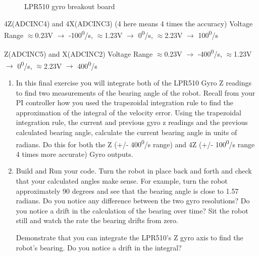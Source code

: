 \documentclass[11pt]{article}
\begin{document}
%
\begin{figure}[H]
    \centering
    \caption{LPR510 gyro breakout board}
\end{figure}
%
\begin{center}
    \small
    4Z(ADCINC4) and 4X(ADCINC3) (4 here means 4 times the accuracy) Voltage Range $\approx$0.23V $\rightarrow$ -100\textsuperscript{0}/s, $\approx$1.23V $\rightarrow$ 0\textsuperscript{0}/s, $\approx$2.23V $\rightarrow$ 100\textsuperscript{0}/s

    Z(ADCINC5) and X(ADCINC2) Voltage Range $\approx$0.23V $\rightarrow$ -400\textsuperscript{0}/s, $\approx$1.23V $\rightarrow$ 0\textsuperscript{0}/s, $\approx$2.23V $\rightarrow$ 400\textsuperscript{0}/s
\end{center}
%
\begin{enumerate}
    \item In this final exercise you will integrate both of the LPR510 Gyro Z readings to find two measurements of the bearing angle of the robot. Recall from your PI controller how you used the trapezoidal integration rule to find the approximation of the integral of the velocity error. Using the trapezoidal integration rule, the current and previous gyro z readings and the previous calculated bearing angle, calculate the current bearing angle in units of radians. Do this for both the Z (+/- 400\textsuperscript{0}/s range) and 4Z (+/- 100\textsuperscript{0}/s range 4 times more accurate) Gyro outputs.
    \item Build and Run your code. Turn the robot in place back and forth and check that your calculated angles make sense. For example, turn the robot approximately 90 degrees and see that the bearing angle is close to 1.57 radians. Do you notice any difference between the two gyro resolutions? Do you notice a drift in the calculation of the bearing over time? Sit the robot still and watch the rate the bearing drifts from zero.
        \begin{checkoff}
                Demonstrate that you can integrate the LPR510’s Z gyro axis to find the robot’s bearing. Do you notice a drift in the integral?
        \end{checkoff}
\end{enumerate}
%
\end{document}
